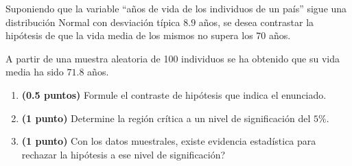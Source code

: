 
Suponiendo que la variable ``años de vida de los individuos de un país'' sigue una distribución Normal con desviación típica $8.9$ años, se desea contrastar la hipótesis de que la vida media de los mismos no supera los 70 años.

A partir de una muestra aleatoria de 100 individuos se ha obtenido que su vida media ha sido $71.8$ años.
\begin{enumerate}[label=\alph*)]
\item \textbf{(0.5 puntos)} Formule el contraste de hipótesis que indica el enunciado.
\item \textbf{(1 punto)} Determine la región crítica a un nivel de significación del $5\%$.
\item \textbf{(1 punto)} Con los datos muestrales, \textquestiondown{}existe evidencia estadística para rechazar la hipótesis a ese nivel de significación?
\end{enumerate}
